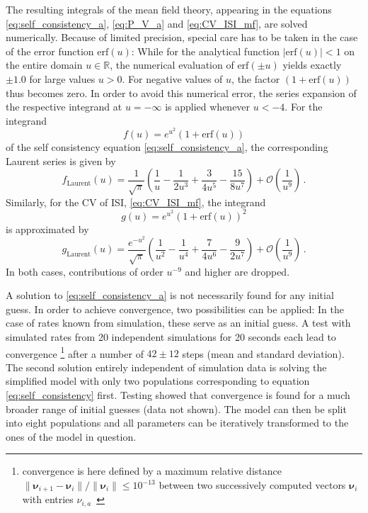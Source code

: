 The resulting integrals of the mean field theory, appearing in the equations 
\eqref{eq:self_consistency_a}, \eqref{eq:P_V_a} and \eqref{eq:CV_ISI_mf}, 
are solved numerically. Because of limited precision, special care has to 
be taken in the case of the error function $\text{erf}(u)$:
While for the analytical 
function $|\text{erf}(u)| < 1$ on the entire domain $u \in \mathbb{R}$, 
the numerical evaluation of 
$\text{erf}(\pm u)$ yields exactly $\pm 1.0$ for large values $u > 0$. 
For negative values of $u$, the factor 
$(1 + \text{erf}(u))$ thus becomes zero.
In order to avoid this numerical error, the series expansion of
the respective integrand at $u = -\infty$ is applied whenever $u < -4$. 
For the integrand 
\begin{equation}
    f(u) = e^{u^2}\left(1 + \text{erf}(u)\right)
    \label{eq:integrand_1}
\end{equation}
of the self consistency equation \eqref{eq:self_consistency_a}, 
the corresponding Laurent series is given by
\begin{equation}
    f_\text{Laurent}(u) = 
        \frac{1}{\sqrt{\pi}} 
        \left( \frac{1}{u} - \frac{1}{2u^3} + \frac{3}{4u^5} - \frac{15}{8u^7} \right) +  
        \mathcal{O}\left( \frac{1}{u^9} \right) \,.
    \label{eq:expand_integrand_1}
\end{equation}
Similarly, for the CV of ISI, \eqref{eq:CV_ISI_mf}, the integrand 
\begin{equation}
    g(u) = e^{u^2}\left(1 + \text{erf}(u)\right)^2
    \label{eq:integrand_2}
\end{equation}
is approximated by
\begin{equation}
    g_\text{Laurent}(u) = 
    \frac{e^{-u^2}}{\sqrt{\pi}} 
        \left( \frac{1}{u^2} - \frac{1}{u^4} + \frac{7}{4u^6} - \frac{9}{2u^7} \right) +  
        \mathcal{O}\left( \frac{1}{u^9} \right) \,.
    \label{eq:expand_integrand_2}
\end{equation}
In both cases, contributions of order $u^{-9}$ and higher are dropped. 

A solution to \eqref{eq:self_consistency_a} is not necessarily found for any initial guess. 
In order to achieve convergence, two possibilities 
can be applied: In the case of rates known from simulation, these serve as an initial guess. 
A test with simulated rates from 20 independent simulations for 20 seconds each lead to convergence%
\footnote{convergence is here defined by a maximum relative distance 
    $\|\boldsymbol\nu_{i + 1} - \boldsymbol\nu_i\| / \|\boldsymbol\nu_i\| \le 10^{-13}$ between two 
    successively computed vectors $\boldsymbol\nu_i$ with entries $\nu_{i, a}$~\cite{scipy}} %
after a number of $42 \pm 12$ steps (mean and standard deviation). 
The second solution entirely independent of simulation data is solving the simplified model 
with only two populations corresponding to equation \eqref{eq:self_consistency} first.
Testing showed that convergence is found for a much broader range of initial guesses (data not shown).
The model can then be split 
into eight populations and all parameters can be iteratively transformed to the ones of the 
model in question. 

